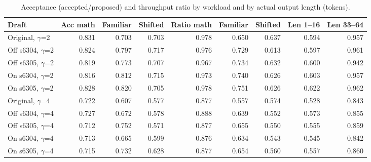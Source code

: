 \begin{table}[!htb]
\centering
\scriptsize
\setlength{\tabcolsep}{3.5pt}
\caption{Acceptance (accepted/proposed) and throughput ratio by workload and by actual output length (tokens).}
\label{tab:t3subsets}
\begin{adjustbox}{max width=\linewidth}
\begin{tabular}{lrrrrrrrr}
\toprule
Draft & Acc math & Familiar & Shifted & Ratio math & Familiar & Shifted & Len 1--16 & Len 33--64 \\
\midrule
Original, $\gamma$=2 & 0.831 & 0.703 & 0.703 & 0.978 & 0.650 & 0.637 & 0.594 & 0.957 \\
Off s6304, $\gamma$=2 & 0.824 & 0.797 & 0.717 & 0.976 & 0.729 & 0.613 & 0.597 & 0.961 \\
Off s6305, $\gamma$=2 & 0.819 & 0.773 & 0.707 & 0.967 & 0.734 & 0.632 & 0.600 & 0.942 \\
On s6304, $\gamma$=2 & 0.816 & 0.812 & 0.715 & 0.973 & 0.740 & 0.626 & 0.603 & 0.957 \\
On s6305, $\gamma$=2 & 0.828 & 0.820 & 0.705 & 0.978 & 0.751 & 0.626 & 0.622 & 0.962 \\
\midrule
Original, $\gamma$=4 & 0.722 & 0.607 & 0.577 & 0.877 & 0.557 & 0.574 & 0.528 & 0.843 \\
Off s6304, $\gamma$=4 & 0.727 & 0.672 & 0.578 & 0.888 & 0.639 & 0.552 & 0.573 & 0.855 \\
Off s6305, $\gamma$=4 & 0.712 & 0.752 & 0.571 & 0.877 & 0.655 & 0.550 & 0.555 & 0.859 \\
On s6304, $\gamma$=4 & 0.713 & 0.665 & 0.599 & 0.876 & 0.634 & 0.543 & 0.545 & 0.842 \\
On s6305, $\gamma$=4 & 0.715 & 0.732 & 0.628 & 0.877 & 0.654 & 0.560 & 0.557 & 0.860 \\
\bottomrule
\end{tabular}
\end{adjustbox}
\end{table}
